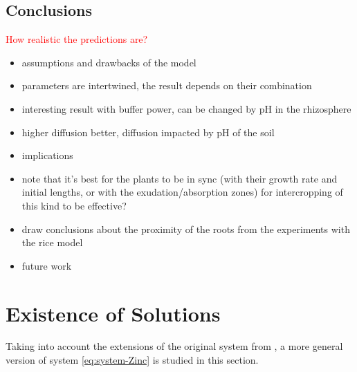 \documentclass[11pt]{article}
\numberwithin{equation}{section}
\begin{document}
\clearpage
\newpage
\subsection{Conclusions}
\textcolor{red}{How realistic the predictions are?}
\begin{itemize}
    \item assumptions and drawbacks of the model
    \item parameters are intertwined, the result depends on their combination
    \item interesting result with buffer power, can be changed by pH in the rhizosphere
    \item higher diffusion better, diffusion impacted by pH of the soil
    \item implications
    \item note that it's best for the plants to be in sync (with their growth rate and initial lengths, or with the exudation/absorption zones) for intercropping of this kind to be effective? 
    \item draw conclusions about the proximity of the roots from the experiments with the rice model
    \item future work
\end{itemize}
\newpage
\clearpage

\newpage
\section{Existence of Solutions}
\label{sec:Existence}

Taking into account the extensions of the original system from \cite{Ptashnyk-2011}, a more general version of system \eqref{eq:system-Zinc} is studied in this section. 
\end{document}
